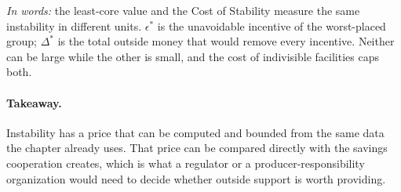 \emph{In words:} the least-core value and the Cost of Stability measure the same instability in different units. $\epsilon^*$ is the unavoidable incentive of the worst-placed group; $\Delta^*$ is the total outside money that would remove every incentive. Neither can be large while the other is small, and the cost of indivisible facilities caps both.

\paragraph{Takeaway.} Instability has a price that can be computed and bounded from the same data the chapter already uses. That price can be compared directly with the savings cooperation creates, which is what a regulator or a producer-responsibility organization would need to decide whether outside support is worth providing.

